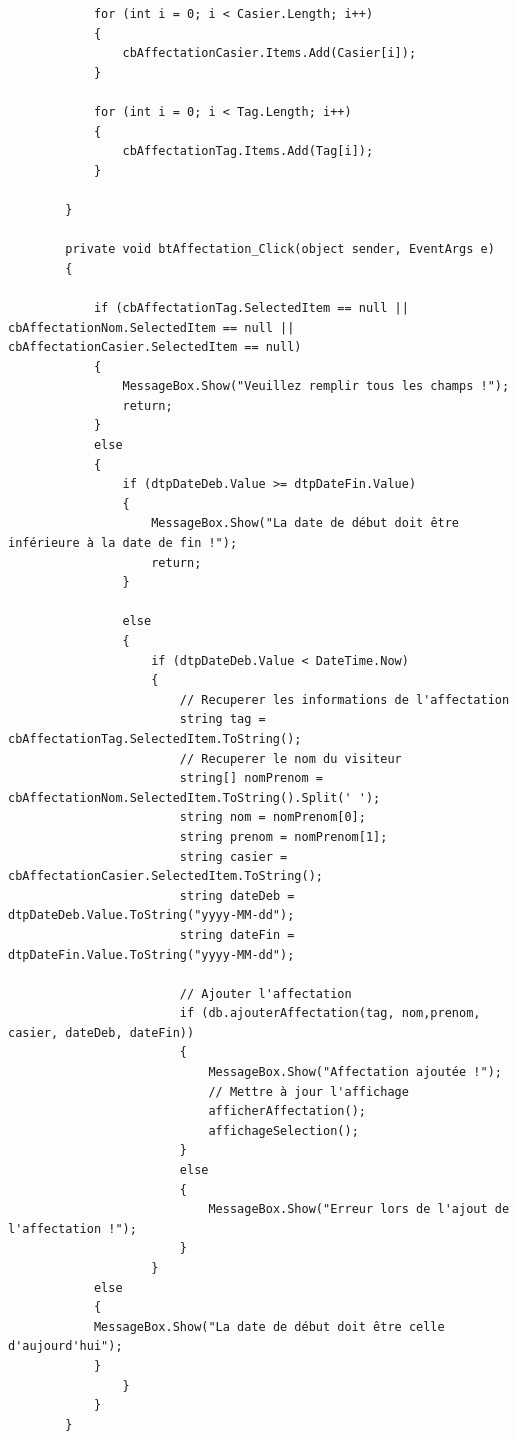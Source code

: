 \documentclass[main.tex]{subfiles}
\begin{document}
\begin{lstlisting}
            for (int i = 0; i < Casier.Length; i++)
            {
                cbAffectationCasier.Items.Add(Casier[i]);
            }

            for (int i = 0; i < Tag.Length; i++)
            {
                cbAffectationTag.Items.Add(Tag[i]);
            }

        }

        private void btAffectation_Click(object sender, EventArgs e)
        {

            if (cbAffectationTag.SelectedItem == null || cbAffectationNom.SelectedItem == null || cbAffectationCasier.SelectedItem == null)
            {
                MessageBox.Show("Veuillez remplir tous les champs !");
                return;
            }
            else
            {
                if (dtpDateDeb.Value >= dtpDateFin.Value)
                {
                    MessageBox.Show("La date de début doit être inférieure à la date de fin !");
                    return;
                }

                else
                {
                    if (dtpDateDeb.Value < DateTime.Now)
                    {
                        // Recuperer les informations de l'affectation
                        string tag = cbAffectationTag.SelectedItem.ToString();
                        // Recuperer le nom du visiteur
                        string[] nomPrenom = cbAffectationNom.SelectedItem.ToString().Split(' ');
                        string nom = nomPrenom[0];
                        string prenom = nomPrenom[1];
                        string casier = cbAffectationCasier.SelectedItem.ToString();
                        string dateDeb = dtpDateDeb.Value.ToString("yyyy-MM-dd");
                        string dateFin = dtpDateFin.Value.ToString("yyyy-MM-dd");

                        // Ajouter l'affectation
                        if (db.ajouterAffectation(tag, nom,prenom, casier, dateDeb, dateFin))
                        {
                            MessageBox.Show("Affectation ajoutée !");
                            // Mettre à jour l'affichage
                            afficherAffectation();
                            affichageSelection();
                        }
                        else
                        {
                            MessageBox.Show("Erreur lors de l'ajout de l'affectation !");
                        }
                    }
		    else 
		    {
			MessageBox.Show("La date de début doit être celle d'aujourd'hui");
		    }
                }
            }
        }


\end{lstlisting}
\end{document}
